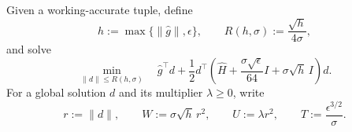 Given a working-accurate tuple, define
\begin{equation}
    h:=\max\{\|\widehat g\|,\epsilon\},
    \qquad
    R(h,\sigma)
    :=
    \frac{\sqrt h}{4\sigma},
    \label{eq:gs-radius}
\end{equation}
and solve
\begin{equation}
    \min_{\|d\|\le R(h,\sigma)}
    \quad
    \widehat g^\top d
    +
    \frac12d^\top
    \left(
        \widehat H
        +
        \frac{\sigma\sqrt\epsilon}{64}I
        +
        \sigma\sqrt h\,I
    \right)d.
    \label{eq:gs-subproblem}
\end{equation}
For a global solution $d$ and its multiplier $\lambda\ge0$, write
\begin{equation}
    r:=\|d\|,
    \qquad
    W:=\sigma\sqrt h\,r^2,
    \qquad
    U:=\lambda r^2,
    \qquad
    T:=\frac{\epsilon^{3/2}}{\sigma}.
    \label{eq:gs-step-quantities}
\end{equation}


